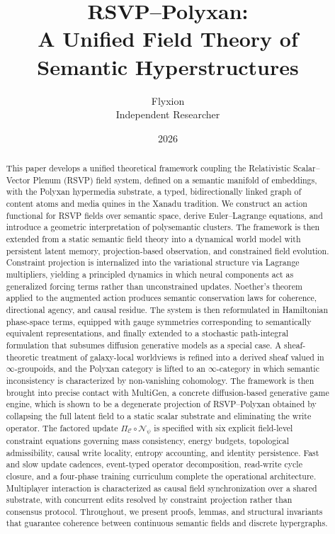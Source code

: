 \documentclass[11pt]{article}
\title{\Huge\bfseries RSVP--Polyxan:\\
A Unified Field Theory of Semantic Hyperstructures}
\author{Flyxion\\[0.4em]
\normalsize Independent Researcher}
\date{2026}
\begin{document}
\maketitle

\begin{abstract}
This paper develops a unified theoretical framework coupling the
Relativistic Scalar--Vector Plenum (RSVP) field system, defined on a
semantic manifold of embeddings, with the Polyxan hypermedia substrate,
a typed, bidirectionally linked graph of content atoms and media quines
in the Xanadu tradition.
We construct an action functional for RSVP fields over semantic space,
derive Euler--Lagrange equations, and introduce a geometric interpretation
of polysemantic clusters.
The framework is then extended from a static semantic field theory into a
dynamical world model with persistent latent memory, projection-based
observation, and constrained field evolution.
Constraint projection is internalized into the variational structure via
Lagrange multipliers, yielding a principled dynamics in which neural
components act as generalized forcing terms rather than unconstrained
updates.
Noether's theorem applied to the augmented action produces semantic
conservation laws for coherence, directional agency, and causal residue.
The system is then reformulated in Hamiltonian phase-space terms,
equipped with gauge symmetries corresponding to semantically equivalent
representations, and finally extended to a stochastic path-integral
formulation that subsumes diffusion generative models as a special case.
A sheaf-theoretic treatment of galaxy-local worldviews is refined into a
derived sheaf valued in $\infty$-groupoids, and the Polyxan category is
lifted to an $\infty$-category in which semantic inconsistency is
characterized by non-vanishing cohomology.
The framework is then brought into precise contact with MultiGen, a
concrete diffusion-based generative game engine, which is shown to be a
degenerate projection of RSVP--Polyxan obtained by collapsing the full
latent field to a static scalar substrate and eliminating the write
operator.
The factored update $\Pi_{\mathcal{C}} \circ \mathcal{N}_\psi$ is
specified with six explicit field-level constraint equations governing
mass consistency, energy budgets, topological admissibility, causal write
locality, entropy accounting, and identity persistence.
Fast and slow update cadences, event-typed operator decomposition,
read-write cycle closure, and a four-phase training curriculum complete
the operational architecture.
Multiplayer interaction is characterized as causal field synchronization
over a shared substrate, with concurrent edits resolved by constraint
projection rather than consensus protocol.
Throughout, we present proofs, lemmas, and structural invariants that
guarantee coherence between continuous semantic fields and discrete
hypergraphs.
\end{abstract}
\end{document}
